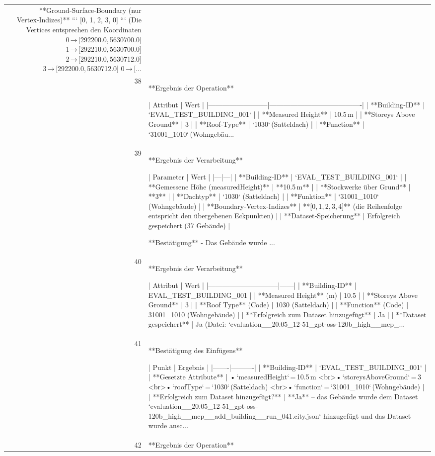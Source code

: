 \documentclass[a4paper,11pt]{article}
\begin{document}
\begin{table}[ht]
\begin{tabular}{r p{12cm}}
**Ground‑Surface‑Boundary (nur Vertex‑Indizes)**  
```
[0, 1, 2, 3, 0]
```  
(Die Vertices entsprechen den Koordinaten  
0 → [292200.0, 5630700.0]  
1 → [292210.0, 5630700.0]  
2 → [292210.0, 5630712.0]  
3 → [292200.0, 5630712.0]  
0 → [... \\
38 & **Ergebnis der Operation**

| Attribut                | Wert                                   |
|--------------------------|----------------------------------------|
| **Building‑ID**          | `EVAL\_TEST\_BUILDING\_001`                |
| **Measured Height**      | 10.5 m                                 |
| **Storeys Above Ground** | 3                                      |
| **Roof‑Type**            | `1030` (Satteldach)                    |
| **Function**             | `31001\_1010` (Wohngebäu... \\
39 & **Ergebnis der Verarbeitung**

| Parameter | Wert |
|---|---|
| **Building‑ID** | `EVAL\_TEST\_BUILDING\_001` |
| **Gemessene Höhe (measuredHeight)** | **10.5 m** |
| **Stockwerke über Grund** | **3** |
| **Dachtyp** | `1030` (Satteldach) |
| **Funktion** | `31001\_1010` (Wohngebäude) |
| **Boundary‑Vertex‑Indizes** | **[0, 1, 2, 3, 4]** (die Reihenfolge entspricht den übergebenen Eckpunkten) |
| **Dataset‑Speicherung** | Erfolgreich gespeichert (37 Gebäude) |

**Bestätigung**  
- Das Gebäude wurde ... \\
40 & **Ergebnis der Verarbeitung**

| Attribut                     | Wert |
|------------------------------|------|
| **Building‑ID**              | EVAL\_TEST\_BUILDING\_001 |
| **Measured Height** (m)      | 10.5 |
| **Storeys Above Ground**     | 3 |
| **Roof Type** (Code)         | 1030 (Satteldach) |
| **Function** (Code)          | 31001\_1010 (Wohngebäude) |
| **Erfolgreich zum Dataset hinzugefügt** | Ja |
| **Dataset gespeichert**      | Ja (Datei: `evaluation\_\_20.05\_12-51\_gpt-oss-120b\_high\_\_mcp\_... \\
41 & **Bestätigung des Einfügens**

| Punkt | Ergebnis |
|-------|----------|
| **Building‑ID** | `EVAL\_TEST\_BUILDING\_001` |
| **Gesetzte Attribute** | • `measuredHeight` = 10.5 m  <br>• `storeysAboveGround` = 3  <br>• `roofType` = `1030` (Satteldach)  <br>• `function` = `31001\_1010` (Wohngebäude) |
| **Erfolgreich zum Dataset hinzugefügt?** | **Ja** – das Gebäude wurde dem Dataset `evaluation\_\_20.05\_12-51\_gpt-oss-120b\_high\_\_mcp\_\_add\_building\_\_run\_041.city.json` hinzugefügt und das Dataset wurde ansc... \\
42 & **Ergebnis der Operation**


\end{tabular}
\end{table}
\end{document}
